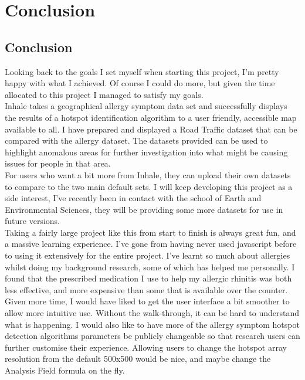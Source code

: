 \chapter{Conclusion}
\label{cha:conc}

\section{Conclusion}

Looking back to the goals I set myself when starting this project, I'm pretty happy with what I achieved. Of course I could do more, but given the time allocated to this project I managed to satisfy my goals.\\

Inhale takes a geographical allergy symptom data set and successfully displays the results of a hotspot identification algorithm to a user friendly, accessible map available to all. I have prepared and displayed a Road Traffic dataset that can be compared with the allergy dataset. The datasets provided can be used to highlight anomalous areas for further investigation into what might be causing issues for people in that area.\\

For users who want a bit more from Inhale, they can upload their own datasets to compare to the two main default sets. I will keep developing this project as a side interest, I've recently been in contact with the school of Earth and Environmental Sciences, they will be providing some more datasets for use in future versions.\\

Taking a fairly large project like this from start to finish is always great fun, and a massive learning experience. I've gone from having never used javascript before to using it extensively for the entire project. I've learnt so much about allergies whilst doing my background research, some of which has helped me personally. I found that the prescribed medication I use to help my allergic rhinitis was both less effective, and more expensive than some that is available over the counter.\\

Given more time, I would have liked to get the user interface a bit smoother to allow more intuitive use. Without the walk-through, it can be hard to understand what is happening. I would also like to have more of the allergy symptom hotspot detection algorithms parameters be publicly changeable so that research users can further customise their experience. Allowing users to change the hotspot array resolution from the default 500x500 would be nice, and maybe change the Analysis Field formula on the fly.\\

